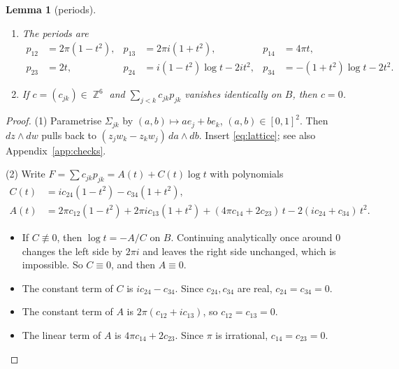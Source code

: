 \documentclass{article}
\DeclareMathOperator{\Z}{\mathbb{Z}}
\newtheorem{lemma}[theorem]{Lemma}
\theoremstyle{definition}
\theoremstyle{plain}
\begin{document}
\begin{lemma}[periods]\label{lem:periods}
\begin{enumerate}
\item The periods are
\begin{align*}
p_{12}&=2\pi(1-t^2), & p_{13}&=2\pi i(1+t^2), & p_{14}&=4\pi t,\\
p_{23}&=2t, & p_{24}&=i(1-t^2)\log t-2it^2, & p_{34}&=-(1+t^2)\log t-2t^2.
\end{align*}
\item If $c=(c_{jk})\in\Z^6$ and $\sum_{j<k}c_{jk}p_{jk}$ vanishes identically on $B$,
  then $c=0$.
\end{enumerate}
\end{lemma}
\begin{proof}
(1) Parametrise $\Sigma_{jk}$ by $(a,b)\mapsto ae_j+be_k$, $(a,b)\in[0,1]^2$. Then
$dz\wedge dw$ pulls back to $(z_jw_k-z_kw_j)\,da\wedge db$. Insert \eqref{eq:lattice};
see also Appendix~\ref{app:checks}.

(2) Write $F=\sum c_{jk}p_{jk}=A(t)+C(t)\log t$ with polynomials
\begin{align*}
C(t)&=ic_{24}(1-t^2)-c_{34}(1+t^2),\\
A(t)&=2\pi c_{12}(1-t^2)+2\pi ic_{13}(1+t^2)+(4\pi c_{14}+2c_{23})\,t-2(ic_{24}+c_{34})\,t^2.
\end{align*}
\begin{itemize}
\item If $C\not\equiv0$, then $\log t=-A/C$ on $B$. Continuing analytically once around
  $0$ changes the left side by $2\pi i$ and leaves the right side unchanged, which is
  impossible. So $C\equiv0$, and then $A\equiv0$.
\item The constant term of $C$ is $ic_{24}-c_{34}$. Since $c_{24},c_{34}$ are real,
  $c_{24}=c_{34}=0$.
\item The constant term of $A$ is $2\pi(c_{12}+ic_{13})$, so $c_{12}=c_{13}=0$.
\item The linear term of $A$ is $4\pi c_{14}+2c_{23}$. Since $\pi$ is irrational,
  $c_{14}=c_{23}=0$.
\end{itemize}
\end{proof}
\end{document}
